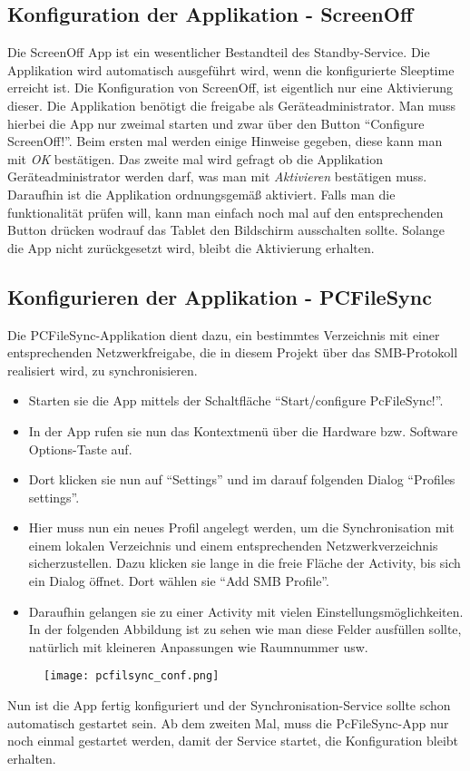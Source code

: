 \begin{flushleft}
  \subsection{Konfiguration der Applikation - ScreenOff}
    Die ScreenOff App ist ein wesentlicher Bestandteil des Standby-Service. Die Applikation wird automatisch ausgeführt wird, wenn die konfigurierte Sleeptime erreicht ist.
    Die Konfiguration von ScreenOff, ist eigentlich nur eine Aktivierung dieser. Die Applikation benötigt die freigabe als Geräteadministrator. Man muss hierbei die App nur zweimal starten und zwar über den Button ``Configure ScreenOff!''. Beim ersten mal werden einige Hinweise gegeben, diese kann man mit \textit{OK} bestätigen. Das zweite mal wird gefragt ob die Applikation Geräteadministrator werden darf, was man mit \textit{Aktivieren} bestätigen muss.
    Daraufhin ist die Applikation ordnungsgemäß aktiviert. Falls man die funktionalität prüfen will, kann  man einfach noch mal auf den entsprechenden Button drücken wodrauf das Tablet den Bildschirm ausschalten sollte. Solange die App nicht zurückgesetzt wird, bleibt die Aktivierung erhalten.
  \subsection{Konfigurieren der Applikation - PCFileSync}
  Die PCFileSync-Applikation dient dazu, ein bestimmtes Verzeichnis mit einer entsprechenden Netzwerkfreigabe, die in diesem Projekt über das SMB-Protokoll realisiert wird, zu synchronisieren.
    \begin{itemize}
      \item Starten sie die App mittels der Schaltfläche ``Start/configure PcFileSync!''.
      \item In der App rufen sie nun das Kontextmenü über die Hardware bzw. Software Options-Taste auf.
      \item Dort klicken sie nun auf ``Settings'' und im darauf folgenden Dialog ``Profiles settings''.
      \item Hier muss nun ein neues Profil angelegt werden, um die Synchronisation mit einem lokalen Verzeichnis und einem entsprechenden Netzwerkverzeichnis sicherzustellen. Dazu klicken sie lange in die freie Fläche der Activity, bis sich ein Dialog öffnet. Dort wählen sie ``Add SMB Profile''.
      \item Daraufhin gelangen sie zu einer Activity mit vielen Einstellungsmöglichkeiten. In der folgenden Abbildung ist zu sehen wie man diese Felder ausfüllen sollte, natürlich mit kleineren Anpassungen wie Raumnummer usw.
      \end{itemize}
      \begin{figure}[htb]
        \centering
        \texttt{[image: pcfilsync\_conf.png]}\\ %
      \end{figure}
      Nun ist die App fertig konfiguriert und der Synchronisation-Service sollte schon automatisch gestartet sein.
      Ab dem zweiten Mal, muss die PcFileSync-App nur noch einmal gestartet werden, damit der Service startet, die Konfiguration bleibt erhalten.    

\end{flushleft}
